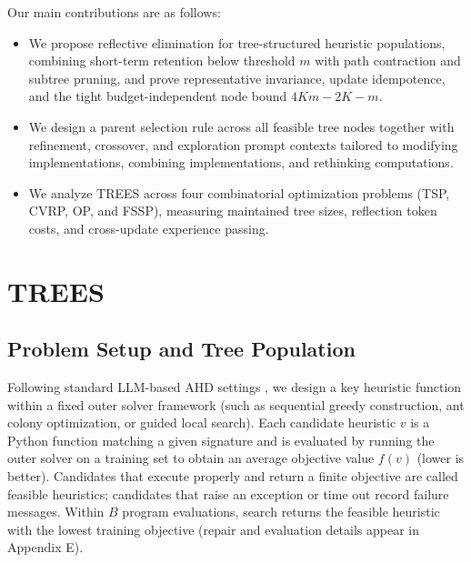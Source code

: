 \documentclass{article}
\begin{document}
Our main contributions are as follows:

\begin{itemize}
\tightlist
\item
  We propose reflective elimination for tree-structured heuristic populations, combining short-term retention below threshold \(m\) with path contraction and subtree pruning, and prove representative invariance, update idempotence, and the tight budget-independent node bound \(4Km-2K-m\).
\item
  We design a parent selection rule across all feasible tree nodes together with refinement, crossover, and exploration prompt contexts tailored to modifying implementations, combining implementations, and rethinking computations.
\item
  We analyze TREES across four combinatorial optimization problems (TSP, CVRP, OP, and FSSP), measuring maintained tree sizes, reflection token costs, and cross-update experience passing.
\end{itemize}

\section{TREES}\label{trees}

\subsection{Problem Setup and Tree Population}\label{problem-setup-and-tree-population}

Following standard LLM-based AHD settings \citep{eoh, mctsahd}, we design a key heuristic function within a fixed outer solver framework (such as sequential greedy construction, ant colony optimization, or guided local search). Each candidate heuristic \(v\) is a Python function matching a given signature and is evaluated by running the outer solver on a training set to obtain an average objective value \(f(v)\) (lower is better). Candidates that execute properly and return a finite objective are called feasible heuristics; candidates that raise an exception or time out record failure messages. Within \(B\) program evaluations, search returns the feasible heuristic with the lowest training objective (repair and evaluation details appear in Appendix E).
\end{document}
